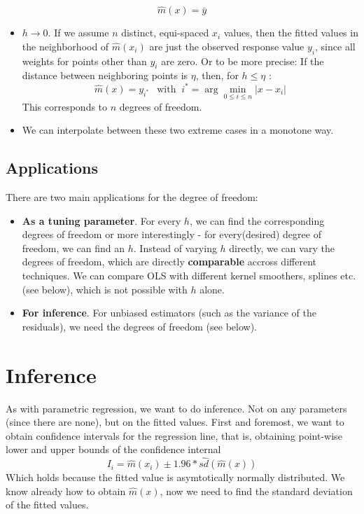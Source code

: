 \documentclass[]{book}
\providecommand{\tightlist}{%
  \setlength{\itemsep}{0pt}\setlength{\parskip}{0pt}}
\begin{document}
\[\hat{m}(x) = \bar{y} \]

\begin{itemize}
\tightlist
\item
  \(h \rightarrow 0\). If we assume \(n\) distinct, equi-spaced \(x_i\)
  values, then the fitted values in the neighborhood of \(\hat{m}(x_i)\)
  are just the observed response value \(y_i\), since all weights for
  points other than \(y_i\) are zero. Or to be more precise: If the
  distance between neighboring points is \(\eta\), then, for
  \(h \leqslant \eta\) :
  \[ \hat{m}(x) = y_{i^*} \;\;\ \text{with} \;\; i^* =  
    \arg\min\limits_{0 \leqslant i \leqslant n} |x - x_i| \] This
  corresponds to \(n\) degrees of freedom.
\item
  We can interpolate between these two extreme cases in a monotone way.
\end{itemize}

\subsection{Applications}\label{applications-1}

There are two main applications for the degree of freedom:

\begin{itemize}
\tightlist
\item
  \textbf{As a tuning parameter}. For every \(h\), we can find the
  corresponding degrees of freedom or more interestingly - for
  every(desired) degree of freedom, we can find an \(h\). Instead of
  varying \(h\) directly, we can vary the degrees of freedom, which are
  directly \textbf{comparable} accross different techniques. We can
  compare OLS with different kernel smoothers, splines etc. (see below),
  which is not possible with \(h\) alone.
\item
  \textbf{For inference}. For unbiased estimators (such as the variance
  of the residuals), we need the degrees of freedom (see below).
\end{itemize}

\section{Inference}\label{inference-1}

As with parametric regression, we want to do inference. Not on any
parameters (since there are none), but on the fitted values. First and
foremost, we want to obtain confidence intervals for the regression
line, that is, obtaining point-wise lower and upper bounds of the
confidence internal
\[ I_i = \hat{m}(x_i) ± 1.96 *\hat{sd}(\hat{m}(x)) \] Which holds
because the fitted value is asymtotically normally distributed. We know
already how to obtain \(\hat{m}(x)\), now we need to find the standard
deviation of the fitted values.
\end{document}
